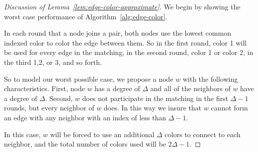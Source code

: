 \begin{proof}[Discussion of Lemma~\ref{lem:edge-color-approximate}]

We begin by showing the worst case performance of Algorithm~\ref{alg:edge-color}. 

In each round that a node joins a pair, both nodes use the lowest common indexed color to color the edge between them. So in the first round, color 1 will be used for every edge in the matching, in the second round, color 1 or color 2, in the third 1,2, or 3, and so forth. 

So to model our worst possible case, we propose a node $w$ with the following characteristics. First, node $w$ has a degree of $\Delta$ and all of the neighbors of $w$ have a degree of $\Delta$. Second, $w$ does not participate in the matching in the first $\Delta-1$ rounds, but every neighbor of $w$ does. In this way we insure that $w$ cannot form an edge with any neighbor with an index of less than $\Delta-1$. 

In this case, $w$ will be forced to use an additional $\Delta$ colors to connect to each neighbor, and the total number of colors used will be $2\Delta-1$.
\end{proof}
